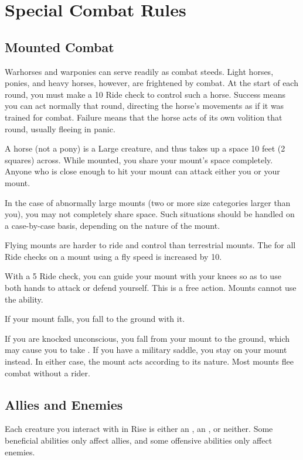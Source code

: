 \section{Special Combat Rules}

  \subsection{Mounted Combat}\label{Mounted Combat}
     Warhorses and warponies can serve readily as combat steeds. Light horses, ponies, and heavy horses, however, are frightened by combat.
    At the start of each round, you must make a  10 Ride check to control such a horse.
    Success means you can act normally that round, directing the horse's movements as if it was trained for combat.
    Failure means that the horse acts of its own volition that round, usually fleeing in panic.

     A horse (not a pony) is a Large creature, and thus takes up a space 10 feet (2 squares) across. While mounted, you share your mount's space completely. Anyone who is close enough to hit your mount can attack either you or your mount.

    In the case of abnormally large mounts (two or more size categories larger than you), you may not completely share space. Such situations should be handled on a case-by-case basis, depending on the nature of the mount.

     Flying mounts are harder to ride and control than terrestrial mounts.
    The  for all Ride checks on a mount using a fly speed is increased by 10.

     With a  5 Ride check, you can guide your mount with your knees so as to use both hands to attack or defend yourself.
    This is a free action.
    Mounts cannot use the  ability.

     If your mount falls, you fall to the ground with it.

     If you are knocked unconscious, you fall from your mount to the ground, which may cause you to take .
    If you have a military saddle, you stay on your mount instead.
    In either case, the mount acts according to its nature.
    Most mounts flee combat without a rider.

  \subsection{Allies and Enemies}\label{Allies and Enemies}
    Each creature you interact with in Rise is either an , an , or neither.
    Some beneficial abilities only affect allies, and some offensive abilities only affect enemies.

